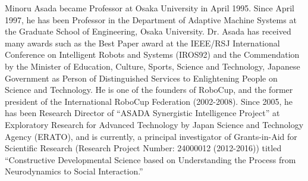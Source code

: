 \documentclass[journal]{IEEEtran}
\begin{document}
\begin{IEEEbiography}{Minoru Asada}
became Professor at Osaka University in April 1995. Since April 1997, he has been Professor in the Department of Adaptive Machine Systems at the Graduate School of Engineering, Osaka University. Dr. Asada has received many awards such as the Best Paper award at the IEEE/RSJ International Conference on Intelligent Robots and Systems (IROS92) and the Commendation by the Minister of Education, Culture, Sports, Science and Technology, Japanese Government as Person of Distinguished Services to Enlightening People on Science and Technology. He is one of the founders of RoboCup, and the former president of the International RoboCup Federation (2002-2008). Since 2005, he has been Research Director of “ASADA Synergistic Intelligence Project” at Exploratory Research for Advanced Technology by Japan Science and Technology Agency (ERATO), and is currently, a principal investigator of Grants-in-Aid for Scientific Research (Research Project Number: 24000012 (2012-2016)) titled “Constructive Developmental Science based on Understanding the Process from Neurodynamics to Social Interaction.”
\end{IEEEbiography}
\end{document}
